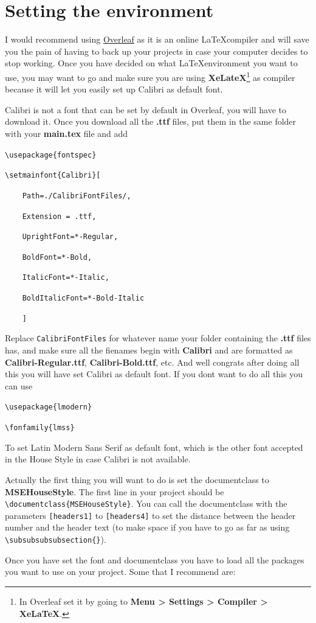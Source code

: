 \documentclass[headers1]{MSEHouseStyle}
\begin{document}
\section{Setting the environment}
\noindent
I would recommend using \href{www.overleaf.com}{Overleaf} as it is an online \LaTeX\space compiler and will save you the pain of having to back up your projects in case your computer decides to stop working. Once you have decided on what \LaTeX\space environment you want to use, you may want to go and make sure you are using \textbf{XeLateX}\footnote{In Overleaf set it by going to \textbf{Menu > Settings > Compiler > XeLaTeX}.} as compiler because it will let you easily set up Calibri as default font. \par
Calibri is not a font that can be set by default in Overleaf, you will have to download it. Once you download all the \textbf{.ttf} files, put them in the same folder with your \textbf{main.tex} file and add \par
\verb|\usepackage{fontspec}| \par
\verb|\setmainfont{Calibri}[| \par
\verb|    Path=./CalibriFontFiles/,| \par
\verb|    Extension = .ttf,| \par
\verb|    UprightFont=*-Regular,| \par
\verb|    BoldFont=*-Bold,| \par
\verb|    ItalicFont=*-Italic,| \par
\verb|    BoldItalicFont=*-Bold-Italic| \par
\verb|    ]| \par
\noindent
Replace \verb|CalibriFontFiles| for whatever name your folder containing the \textbf{.ttf} files has, and make sure all the fienames begin with \textbf{Calibri} and are formatted as \textbf{Calibri-Regular.ttf}, \textbf{Calibri-Bold.ttf}, etc. And well congrats after doing all this you will have set Calibri as default font. If you dont want to do all this you can use \par
\verb|\usepackage{lmodern}| \par
\verb|\fonfamily{lmss}| \par
\noindent
To set Latin Modern Sans Serif as default font, which is the other font accepted in the House Style in case Calibri is not available. \par
Actually the first thing you will want to do is set the documentclass to \textbf{MSEHouseStyle}. The first line in your project should be \verb|\documentclass{MSEHouseStyle}|. You can call the documentclass with the parameters \verb|[headers1]| to \verb|[headers4]| to set the distance between the header number and the header text (to make space if you have to go as far as using \verb|\subsubsubsubsection{}|). \par  
Once you have set the font and documentclass you have to load all the packages you want to use on your project. Some that I recommend are:
\end{document}
